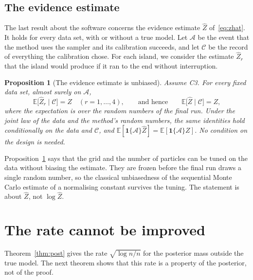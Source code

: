 \documentclass[11pt]{article}
\newcommand{\E}{\mathbb{E}}
\newcommand{\ind}[1]{\mathbf{1}\{#1\}}
\newcommand{\Zhat}{\hat Z}
\newcommand{\rn}{\sqrt{\log n/n}}
\newcommand{\Acal}{\mathcal A}
\newcommand{\Ccal}{\mathcal C}
\theoremstyle{plain}
\newtheorem{prop}[thm]{Proposition}
\theoremstyle{definition}
\begin{document}
\subsection{The evidence estimate}\label{sec:evidence}

The last result about the software concerns the evidence estimate $\Zhat$ of~\eqref{eq:zhat}. It holds for every data
set, with or without a true model. Let $\Acal$ be the event that the method uses the sampler and its calibration
succeeds, and let $\Ccal$ be the record of everything the calibration chose. For each island, we consider the estimate
$\Zhat_r$ that the island would produce if it ran to the end without interruption.

\begin{prop}[The evidence estimate is unbiased]\label{prop:unbiased}
Assume C3. For every fixed data set, almost surely on $\Acal$,
\[
  \E\big[\Zhat_r\mid\Ccal\big]=Z\quad(r=1,\dots,4),\qquad\text{and hence}\qquad \E\big[\Zhat\mid\Ccal\big]=Z ,
\]
where the expectation is over the random numbers of the final run. Under the joint law of the data and the method's
random numbers, the same identities hold conditionally on the data and $\Ccal$, and
$\E[\ind{\Acal}\Zhat]=\E[\ind{\Acal}Z]$. No condition on the design is needed.
\end{prop}

Proposition~\ref{prop:unbiased} says that the grid and the number of particles can be tuned on the data without
biasing the estimate. They are frozen before the final run draws a single random number, so the classical unbiasedness
of the sequential Monte Carlo estimate of a normalising constant \citep{DelMoral2004} survives the tuning. The
statement is about $\Zhat$, not $\log\Zhat$.

\section{The rate cannot be improved}\label{sec:sharp}

Theorem~\ref{thm:post} gives the rate $\rn$ for the posterior mass outside the true model. The next theorem shows that
this rate is a property of the posterior, not of the proof.
\end{document}
